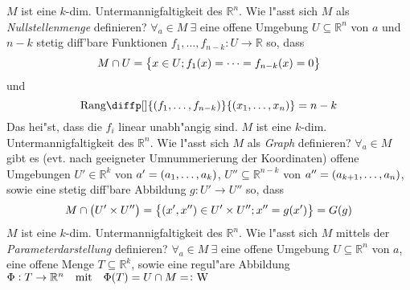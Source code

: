 \documentclass[9pt]{article}
\newenvironment{field}{}{\newpage}
\newif\ifnote
\newenvironment{note}{\notetrue}{\notefalse}
\newcommand{\localtag}{}
\newcommand{\globaltag}{}
\newcommand{\uuid}{}
\newcommand{\tags}[1]{
    \ifnote 
        \renewcommand{\localtag}{#1}
    \else
        \renewcommand{\globaltag}{#1}
    \fi 
    }
\newcommand{\xplain}[1]{\renewcommand{\uuid}{#1}}
\begin{document}
\begin{note}
	\tags{satz, 1.1.3}
	\xplain{9e952d37-701a-44bc-9c3d-4bf6ed35b42b}
	\begin{field}
		$M$ ist eine $k$-dim. Untermannigfaltigkeit des $\mathbb{R}^n$. Wie l"asst sich $M$ als \textit{Nullstellenmenge} 	definieren? 
	\end{field}
	\begin{field}
		$\forall_a \in M \ \exists$ eine offene Umgebung $U \subseteq \mathbb{R}^{n}$ von $a$ und $n-k$ stetig diff'bare Funktionen $f_1, \dots , f_{n-k} : U \rightarrow \mathbb{R}$ so, dass
		\begin{equation*}
			M \cap U = \qty{x \in U; f_1(x) = \dots = f_{n-k}(x) = 0}
		\end{equation*}
		und
		\begin{equation*}
			\text{Rang}\diffp[]{\qty(f_1,\dots, f_{n-k})}{\qty(x_1,\dots,x_n)} = n-k
		\end{equation*}
		Das hei"st, dass die $f_i$ linear unabh"angig sind.
	\end{field}
	\begin{field}
		$M$ ist eine $k$-dim. Untermannigfaltigkeit des $\mathbb{R}^n$.
		Wie l"asst sich $M$ als \textit{Graph} definieren?
	\end{field}
	\begin{field}
		$\forall_a \in M$ gibt es (evt. nach geeigneter Umnummerierung der Koordinaten) offene Umgebungen $U' \in \mathbb{R}^k$ von $a'=\qty(a_1,\dots ,a_k)$, $U''\subseteq \mathbb{R}^{n-k}$ von $a'' = \qty(a_{k+1}, \dots , a_n)$, sowie eine stetig diff'bare Abbildung $g: U' \rightarrow U ''$ so, dass 
		\begin{equation*}
			M \cap \qty(U' \times U'') = \qty{(x', x'') \in U' \times U''; x'' = g(x')} = G(g)
		\end{equation*}
	\end{field}
	\begin{field}
		$M$ ist eine $k$-dim. Untermannigfaltigkeit des $\mathbb{R}^n$. Wie l"asst sich $M$ mittels der
		\textit{Parameterdarstellung} definieren?
	\end{field}
	\begin{field}
		$\forall_a \in M \ \exists$ eine offene Umgebung $U\subseteq \mathbb{R}^n$ von $a$, eine offene Menge $T \subseteq \mathbb{R}^k$, sowie eine regul"are Abbildung $\Phi:T\rightarrow \mathbb{R}^n \qq{mit} \Phi(T) = U \cap M = \colon \W $
	\end{field}
\end{note}
\end{document}
